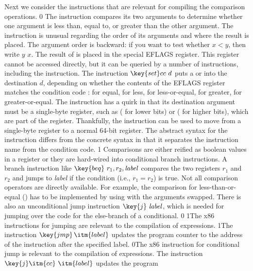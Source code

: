 \documentclass[7x10]{TimesAPriori_MIT}%
\def\racketEd{0}
\def\pythonEd{1}
\def\edition{1}
\def\xeightysixEd{0}
\def\riscvEd{1}
\def\architecture{1}
\newcommand{\racket}[1]{{\if\edition\racketEd{#1}\fi}}
\newcommand{\pythonColor}[0]{}
\newcommand{\python}[1]{{\if\edition\pythonEd\pythonColor #1\fi}}
\numberwithin{theorem}{chapter}
\numberwithin{definition}{chapter}
\numberwithin{equation}{chapter}
\begin{document}
Next we consider the {\ArchName} instructions that are relevant for compiling
the comparison operations.
\if\architecture\xeightysixEd
The  instruction compares its two
arguments to determine whether one argument is less than, equal to, or
greater than the other argument. The  instruction is unusual
regarding the order of its arguments and where the result is
placed. The argument order is backward: if you want to test whether
$x < y$, then write  $y$\code{,} $x$. The result of
 is placed in the special EFLAGS register. This register
cannot be accessed directly, but it can be queried by a number of
instructions, including the  instruction. The instruction
$\key{set}cc~d$ puts a  or  into the destination $d$,
depending on whether the contents of the EFLAGS register matches the
condition code :  for equal,  for less, 
for less-or-equal,  for greater,  for greater-or-equal.
The  instruction has a quirk in that its destination argument
must be a single-byte register, such as  ( for lower bits) or
 ( for higher bits), which are part of the 
register.  Thankfully, the  instruction can be used to
move from a single-byte register to a normal 64-bit register.  The
abstract syntax for the  instruction differs from the
concrete syntax in that it separates the instruction name from the
condition code.
\fi
\if\architecture\riscvEd
Comparisons are either reified as boolean values in a register or they
are hard-wired into conditional branch instructions. A
branch instruction like $\key{beq}~r_1, r_2, \mathit{label}$ compares
the two registers $r_1$ and $r_2$ and jumps to \textit{label} if the
condition (i.e., $r_1 = r_2$) is true. Not all comparison operators
are directly available. For example, the comparison for less-than-or-equal
(\code{<=}) has to be implemented by 
using  with the arguments swapped. There is also an unconditional
jump instruction $\key{j}~\mathit{label}$, which is needed for jumping
over the code for the else-branch of a conditional.
\fi
\if\architecture\xeightysixEd
\python{The x86 instructions for jumping are relevant to the
  compilation of \key{if} expressions.}
%
\python{The instruction $\key{jmp}\,\itm{label}$ updates the program
  counter to the address of the instruction after the specified
  label.}
%
\racket{The x86 instruction for conditional jump is relevant to the
  compilation of \key{if} expressions.}
%
The instruction $\key{j}\itm{cc}~\itm{label}$ updates the program
\end{document}
